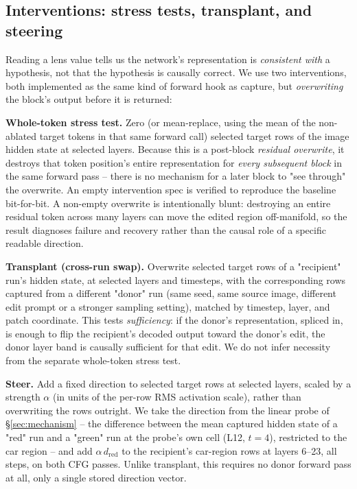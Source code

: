 \documentclass[10pt,twocolumn,letterpaper]{article}
\begin{document}
\subsection{Interventions: stress tests, transplant, and steering}\label{sec:interventions}
Reading a lens value tells us the network's representation is
\emph{consistent with} a hypothesis, not that the hypothesis is
causally correct. We use two interventions, both implemented as the same
kind of forward hook as capture, but \emph{overwriting} the block's
output before it is returned:

\textbf{Whole-token stress test.} Zero (or mean-replace, using the mean of the
non-ablated target tokens in that same forward call) selected target
rows of the image hidden state at selected layers. Because this is a
post-block \emph{residual overwrite}, it destroys that token position's
entire representation for \emph{every subsequent block} in the same
forward pass -- there is no mechanism for a later block to "see through"
the overwrite. An empty intervention spec is verified to reproduce the
baseline bit-for-bit. A non-empty overwrite is intentionally blunt:
destroying an entire residual token across many layers can move the
edited region off-manifold, so the result diagnoses failure and recovery
rather than the causal role of a specific readable direction.

\textbf{Transplant (cross-run swap).} Overwrite selected target rows of
a "recipient" run's hidden state, at selected layers and timesteps, with
the corresponding rows captured from a different "donor" run (same
seed, same source image, different edit prompt or a stronger sampling
setting), matched by timestep, layer, and patch coordinate. This tests
\emph{sufficiency}: if the donor's representation, spliced in, is enough
to flip the recipient's decoded output toward the donor's edit, the
donor layer band is causally sufficient for that edit. We do not infer
necessity from the separate whole-token stress test.

\textbf{Steer.} Add a fixed direction to selected target rows at
selected layers, scaled by a strength $\alpha$ (in units of the
per-row RMS activation scale), rather than overwriting the rows
outright. We take the direction from the linear probe of
\S\ref{sec:mechanism} -- the difference between the mean captured
hidden state of a "red" run and a "green" run at the probe's own
cell (L12, $t{=}4$), restricted to the car region -- and add
$\alpha\,d_{\text{red}}$ to the recipient's car-region rows at layers
6--23, all steps, on both CFG passes. Unlike transplant, this requires
no donor forward pass at all, only a single stored direction vector.
\end{document}
